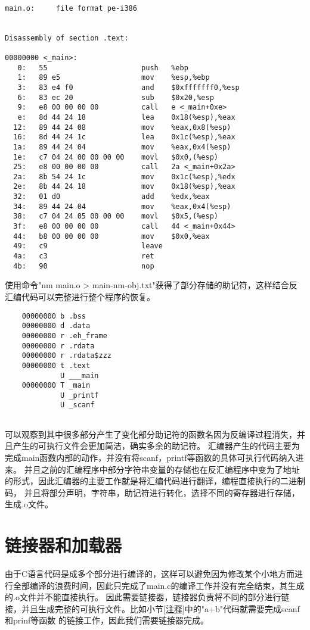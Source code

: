 \documentclass[UTF8]{ctexart}
\begin{document}
\begin{lstlisting}
    
main.o:     file format pe-i386


Disassembly of section .text:

00000000 <_main>:
   0:	55                   	push   %ebp
   1:	89 e5                	mov    %esp,%ebp
   3:	83 e4 f0             	and    $0xfffffff0,%esp
   6:	83 ec 20             	sub    $0x20,%esp
   9:	e8 00 00 00 00       	call   e <_main+0xe>
   e:	8d 44 24 18          	lea    0x18(%esp),%eax
  12:	89 44 24 08          	mov    %eax,0x8(%esp)
  16:	8d 44 24 1c          	lea    0x1c(%esp),%eax
  1a:	89 44 24 04          	mov    %eax,0x4(%esp)
  1e:	c7 04 24 00 00 00 00 	movl   $0x0,(%esp)
  25:	e8 00 00 00 00       	call   2a <_main+0x2a>
  2a:	8b 54 24 1c          	mov    0x1c(%esp),%edx
  2e:	8b 44 24 18          	mov    0x18(%esp),%eax
  32:	01 d0                	add    %edx,%eax
  34:	89 44 24 04          	mov    %eax,0x4(%esp)
  38:	c7 04 24 05 00 00 00 	movl   $0x5,(%esp)
  3f:	e8 00 00 00 00       	call   44 <_main+0x44>
  44:	b8 00 00 00 00       	mov    $0x0,%eax
  49:	c9                   	leave  
  4a:	c3                   	ret    
  4b:	90                   	nop
\end{lstlisting}
使用命令"nm main.o > main-nm-obj.txt"获得了部分存储的助记符，这样结合反汇编代码可以完整进行整个程序的恢复。
\begin{lstlisting}
    00000000 b .bss
    00000000 d .data
    00000000 r .eh_frame
    00000000 r .rdata
    00000000 r .rdata$zzz
    00000000 t .text
             U ___main
    00000000 T _main
             U _printf
             U _scanf
     
\end{lstlisting}
可以观察到其中很多部分产生了变化部分助记符的函数名因为反编译过程消失，并且产生的可执行文件会更加简洁，确实多余的助记符。
汇编器产生的代码主要为完成main函数内部的动作，并没有将scanf，printf等函数的具体可执行代码纳入进来。
并且之前的汇编程序中部分字符串变量的存储也在反汇编程序中变为了地址的形式，因此汇编器的主要工作就是将汇编代码进行翻译，编程直接执行的二进制码，
并且将部分声明，字符串，助记符进行转化，选择不同的寄存器进行存储，生成.o文件。
\section{链接器和加载器}
由于C语言代码是成多个部分进行编译的，这样可以避免因为修改某个小地方而进行全部编译的浪费时间，因此只完成了main.c的编译工作并没有完全结束，其生成的.o文件并不能直接执行。
因此需要链接器，链接器负责将不同的部分进行链接，并且生成完整的可执行文件。比如小节{\ref{注释}}中的"a+b"代码就需要完成scanf和prinf等函数
的链接工作，因此我们需要链接器完成。
\end{document}
